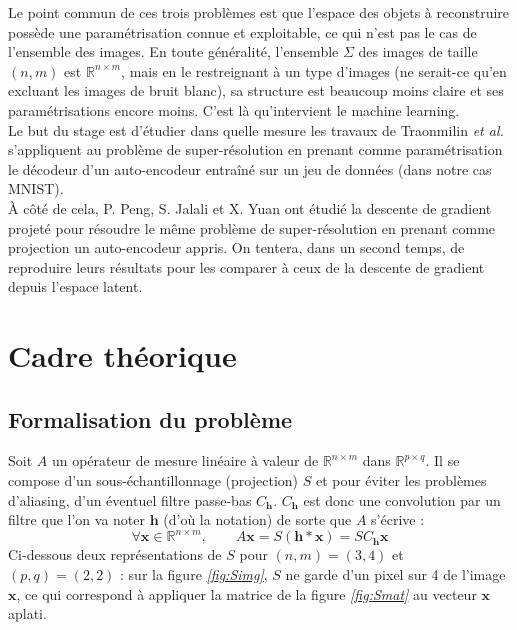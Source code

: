 \documentclass[hidelinks, french]{article} %
\newcommand{\R}{\mathbb{R}}
\newcommand{\etal}{\textit{et al. }}
\renewcommand{\bf}[1]{\boldsymbol{#1}}
\theoremstyle{enonce}
\theoremstyle{special}
\theoremstyle{rq}
\theoremstyle{exo}
\theoremstyle{demo}
\begin{document}
Le point commun de ces trois problèmes est que l'espace des objets à reconstruire possède une paramétrisation connue et exploitable, ce qui n'est pas le cas de l'ensemble des images. En toute généralité, l'ensemble $\Sigma$ des images de taille $(n,m)$ est $\R^{n\times m}$, mais en le restreignant à un type d'images (ne serait-ce qu'en excluant les images de bruit blanc), sa structure est beaucoup moins claire et ses paramétrisations encore moins. C'est là qu'intervient le machine learning.
\\

Le but du stage est d'étudier dans quelle mesure les travaux de Traonmilin \etal s'appliquent au problème de super-résolution en prenant comme paramétrisation le décodeur d'un auto-encodeur entraîné sur un jeu de données (dans notre cas MNIST).
\\
\`A côté de cela, P. Peng, S. Jalali et X. Yuan ont étudié la descente de gradient projeté pour résoudre le même problème de super-résolution en prenant comme projection un auto-encodeur appris. On tentera, dans un second temps, de reproduire leurs résultats pour les comparer à ceux de la descente de gradient depuis l'espace latent.
\\





\section{Cadre théorique}\label{sec:cadre theo}


\subsection{Formalisation du problème}\label{sec:forma2pb}

Soit $A$ un opérateur de mesure linéaire à valeur de $\R^{n\times m}$ dans $\R^{p\times q}$. Il se compose d'un sous-échantillonnage (projection) $S$ et pour éviter les problèmes d'aliasing, d'un éventuel filtre passe-bas $C_{\bf{h}}$. $C_{\bf{h}}$ est donc une convolution par un filtre que l'on va noter $\bf{h}$ (d'où la notation) de sorte que $A$ s'écrive :
\[\forall \bf{x}\in\R^{n\times m},\qquad A\bf{x}=S(\bf{h}*\bf{x})=SC_{\bf{h}}\bf{x}\]
Ci-dessous deux représentations de $S$ pour $(n,m)=(3, 4)$ et $(p,q)=(2, 2)$ : sur la figure \textit{\ref{fig:Simg}}, $S$ ne garde d'un pixel sur 4 de l'image $\bf{x}$, ce qui correspond à appliquer la matrice de la figure \textit{\ref{fig:Smat}} au vecteur $\bf{x}$ aplati.
\end{document}
